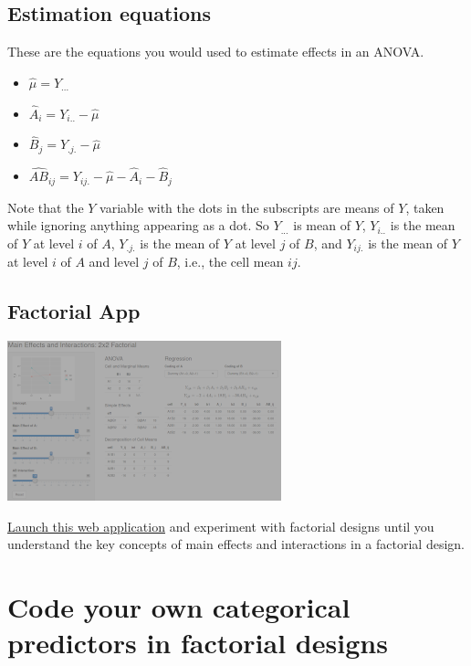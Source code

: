 \documentclass[]{book}
\providecommand{\tightlist}{%
  \setlength{\itemsep}{0pt}\setlength{\parskip}{0pt}}
\begin{document}
\hypertarget{estimation-equations}{%
\subsection{Estimation equations}\label{estimation-equations}}

These are the equations you would used to estimate effects in an ANOVA.

\begin{itemize}
\tightlist
\item
  \(\hat{\mu} = Y_{...}\)
\item
  \(\hat{A}_i = Y_{i..} - \hat{\mu}\)
\item
  \(\hat{B}_j = Y_{.j.} - \hat{\mu}\)
\item
  \(\widehat{AB}_{ij} = Y_{ij.} - \hat{\mu} - \hat{A}_i - \hat{B}_j\)
\end{itemize}

Note that the \(Y\) variable with the dots in the subscripts are means of \(Y\), taken while ignoring anything appearing as a dot. So \(Y_{...}\) is mean of \(Y\), \(Y_{i..}\) is the mean of \(Y\) at level \(i\) of \(A\), \(Y_{.j.}\) is the mean of \(Y\) at level \(j\) of \(B\), and \(Y_{ij.}\) is the mean of \(Y\) at level \(i\) of \(A\) and level \(j\) of \(B\), i.e., the cell mean \(ij\).

\hypertarget{factorial-app}{%
\subsection{Factorial App}\label{factorial-app}}

\includegraphics{images/04-interactions_factorial_app.png}

\href{https://shiny.psy.gla.ac.uk/Dale/factorial2}{Launch this web application} and experiment with factorial designs until you understand the key concepts of main effects and interactions in a factorial design.

\hypertarget{code-your-own-categorical-predictors-in-factorial-designs}{%
\section{Code your own categorical predictors in factorial designs}\label{code-your-own-categorical-predictors-in-factorial-designs}}
\end{document}
